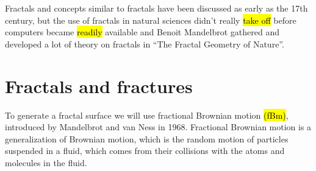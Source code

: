 Fractals and concepts similar to fractals have been discussed as early as the 17th century, but the use of fractals in natural sciences didn't really \hl{take off} before computers became \hl{readily} available and Benoit Mandelbrot gathered and developed a lot of theory on fractals in ``The Fractal Geometry of Nature''\cite{mandelbrot1983fractal}. 


% 
% 

\chapter{Fractals and fractures}
%
%
To generate a fractal surface we will use fractional Brownian motion \hl{(fBm)}, introduced by Mandelbrot and van Ness in 1968\cite{mandelbrot1968fractional}. Fractional Brownian motion is a generalization of Brownian motion, which is the random motion of particles suspended in a fluid, which comes from their collisions with the atoms and molecules in the fluid. 

